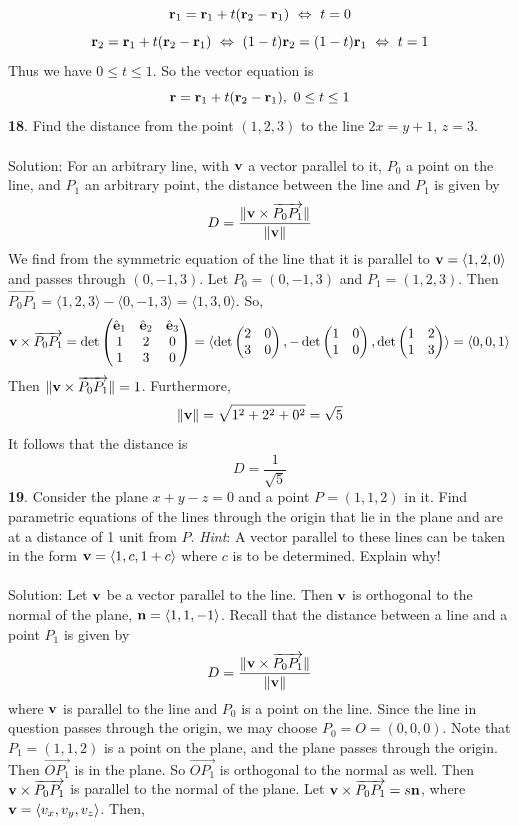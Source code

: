 \documentclass[12pt]{amsbook}
\newcommand{\la}{\langle}
\newcommand{\ra}{\rangle}
\begin{document}
$${\bf r}_1={\bf r}_1+t({\bf r}_2-{\bf r}_1) \ \Leftrightarrow \ t=0$$
$${\bf r}_2={\bf r}_1+t({\bf r}_2-{\bf r}_1) \ \Leftrightarrow \ (1-t){\bf r}_2=(1-t){\bf r}_1 \ \Leftrightarrow \ t=1 $$
Thus we have $0\leq t \leq 1$. So the vector equation is
$${\bf r}={\bf r}_1+t({\bf r}_2-{\bf r}_1), \ 0\leq t \leq 1$$
{\small\bf 18}. Find the distance from the point $(1,2,3)$ to the 
line $2x=y+1$, $z=3$.\\
\\
{\sc Solution}: For an arbitrary line, with ${\bf v}$ a vector parallel to it, $P_0$ a point on the line, and $P_1$ an arbitrary point, the distance between the line and $P_1$ is given by
$$D=\frac{\|{\bf v}\times\overrightarrow{P_0P_1}\|}{\|{\bf v}\|}$$
We find from the symmetric equation of the line that it is parallel to ${\bf v}=\la 1,2,0 \ra$ and passes through $(0,-1,3)$. Let $P_0=(0,-1,3)$ and $P_1=(1,2,3)$. Then $\overrightarrow{P_0P_1}=\la 1,2,3 \ra - \la 0,-1,3 \ra = \la 1, 3, 0 \ra$. So,
$${\bf v}\times\overrightarrow{P_0P_1}=\det
\begin{pmatrix}
\hat{\bf e}_1 & \hat{\bf e}_2 & \hat{\bf e}_3\cr 1&2&0\cr 1&3&0 \end{pmatrix}=\la \det\begin{pmatrix}2&0\cr 3&0  \end{pmatrix}, -\det\begin{pmatrix}1&0\cr 1&0  \end{pmatrix}, \det\begin{pmatrix}1&2\cr 1&3 \end{pmatrix} \ra = \la 0,0,1 \ra$$
Then $\|{\bf v}\times\overrightarrow{P_0P_1}\|=1$. Furthermore,
$$\|{\bf v}\|=\sqrt{1^2+2^2+0^2}=\sqrt{5}$$
It follows that the distance is
$$D=\frac{1}{\sqrt{5}}$$
{\small\bf 19}. Consider the plane $x+y-z=0$ and a point $P=(1,1,2)$ in
it. Find parametric equations of the lines through the origin 
that lie in the plane and
are at a distance of 1 unit from $P$. {\it Hint}: A vector parallel
to these lines can be taken in the form
${\bf v}=\la 1,c,1+c\ra$ where $c$ is to be determined.
Explain why!\\
\\
{\sc Solution}: Let ${\bf v}$ be a vector parallel to the line. Then ${\bf v}$ is orthogonal to the normal of the plane, ${\bf n}=\la 1,1,-1\ra$. Recall that the distance between a line and a point $P_1$ is given by
$$D=\frac{\|{\bf v}\times\overrightarrow{P_0P_1}\|}{\|{\bf v}\|}$$
where ${\bf v}$ is parallel to the line and $P_0$ is a point on the line. Since the line in question passes through the origin, we may choose $P_0=O=(0,0,0)$. Note that $P_1=(1,1,2)$ is a point on the plane, and the plane passes through the origin. Then $\overrightarrow{OP_1}$ is in the plane. So $\overrightarrow{OP_1}$ is orthogonal to the normal as well. Then ${\bf v}\times\overrightarrow{P_0P_1}$ is parallel to the normal of the plane. Let ${\bf v}\times\overrightarrow{P_0P_1}=s{\bf n}$, where ${\bf v}=\la v_x,v_y,v_z\ra$. Then,
\end{document}
